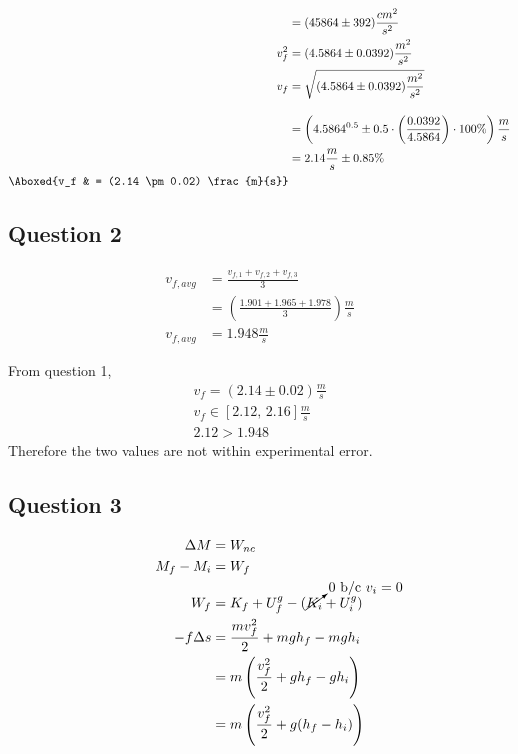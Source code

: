 \documentclass{article}
\begin{document}
\begin{align*}
                                                   & = (45864 \pm 392) \frac{cm^2}{s^2}                                                                      \\
    v_f^2                                          & = (4.5864 \pm 0.0392) \frac{m^2}{s^2}                                                                   \\
    v_f                                            & = \sqrt{(4.5864 \pm 0.0392) \frac{m^2}{s^2}}                                                            \\[10pt]
                                                   & = \left(4.5864^{0.5} \pm 0.5 \cdot \left( \frac{0.0392}{4.5864} \right) \cdot 100\% \right) \frac{m}{s} \\
                                                   & = 2.14 \frac{m}{s} \pm 0.85\%                                                                           \\
    \Aboxed{v_f                                    & = (2.14 \pm 0.02) \frac{m}{s}}
\end{align*}

\subsection{Question 2}

\begin{align*}
    v_{f,avg} & = \frac{v_{f,1} + v_{f,2} + v_{f,3}}{3}                      \\
              & = \left( \frac{1.901 + 1.965 + 1.978}{3} \right) \frac{m}{s} \\
    v_{f,avg} & = 1.948 \frac{m}{s}
\end{align*}

\noindent From question 1,
\begin{gather*}
    v_f = (2.14 \pm 0.02) \frac{m}{s} \\
    v_f \in [2.12, \, 2.16] \frac{m}{s} \\
    2.12 > 1.948
\end{gather*}
Therefore the two values are not within experimental error.

\newpage
\subsection{Question 3}

\begin{align*}
    \Delta M    & = W_{nc}                                                         \\
    M_f - M_i   & = W_f                                                            \\
    W_f         & = K_f + U^g_f - (\cancelto{0 \text{ b/c } v_i = 0}{K_i} + U^g_i) \\
    -f \Delta s & = \frac{mv_f^2}{2} + mgh_f - mgh_i                               \\
                & = m \left( \frac{v_f^2}{2} + gh_f - gh_i \right)                 \\
                & = m \left( \frac{v_f^2}{2} + g(h_f - h_i) \right)
\end{align*}
\end{document}
